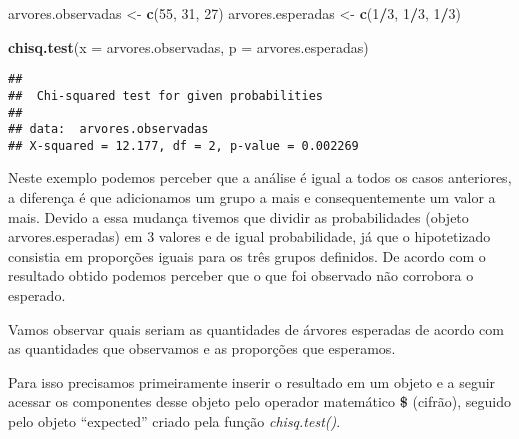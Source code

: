 \documentclass[]{book}
\newenvironment{Shaded}{\begin{snugshade}}{\end{snugshade}}
\newcommand{\DataTypeTok}[1]{\textcolor[rgb]{0.13,0.29,0.53}{#1}}
\newcommand{\DecValTok}[1]{\textcolor[rgb]{0.00,0.00,0.81}{#1}}
\newcommand{\KeywordTok}[1]{\textcolor[rgb]{0.13,0.29,0.53}{\textbf{#1}}}
\newcommand{\NormalTok}[1]{#1}
\newcommand{\OperatorTok}[1]{\textcolor[rgb]{0.81,0.36,0.00}{\textbf{#1}}}
\newcommand{\StringTok}[1]{\textcolor[rgb]{0.31,0.60,0.02}{#1}}
\begin{document}
\begin{Shaded}
\begin{Highlighting}[]
\NormalTok{arvores.observadas <-}\StringTok{ }\KeywordTok{c}\NormalTok{(}\DecValTok{55}\NormalTok{, }\DecValTok{31}\NormalTok{, }\DecValTok{27}\NormalTok{)}
\NormalTok{arvores.esperadas <-}\StringTok{ }\KeywordTok{c}\NormalTok{(}\DecValTok{1}\OperatorTok{/}\DecValTok{3}\NormalTok{, }\DecValTok{1}\OperatorTok{/}\DecValTok{3}\NormalTok{, }\DecValTok{1}\OperatorTok{/}\DecValTok{3}\NormalTok{)}

\KeywordTok{chisq.test}\NormalTok{(}\DataTypeTok{x =}\NormalTok{ arvores.observadas, }\DataTypeTok{p =}\NormalTok{ arvores.esperadas)}
\end{Highlighting}
\end{Shaded}

\begin{verbatim}
## 
##  Chi-squared test for given probabilities
## 
## data:  arvores.observadas
## X-squared = 12.177, df = 2, p-value = 0.002269
\end{verbatim}

Neste exemplo podemos perceber que a análise é igual a todos os casos anteriores, a diferença é que adicionamos um grupo a mais e consequentemente um valor a mais. Devido a essa mudança tivemos que dividir as probabilidades (objeto arvores.esperadas) em 3 valores e de igual probabilidade, já que o hipotetizado consistia em proporções iguais para os três grupos definidos. De acordo com o resultado obtido podemos perceber que o que foi observado não corrobora o esperado.

Vamos observar quais seriam as quantidades de árvores esperadas de acordo com as quantidades que observamos e as proporções que esperamos.

Para isso precisamos primeiramente inserir o resultado em um objeto e a seguir acessar os componentes desse objeto pelo operador matemático \textbf{\$} (cifrão), seguido pelo objeto ``expected'' criado pela função \emph{chisq.test()}.

\begin{Shaded}
\end{Shaded}
\end{document}
